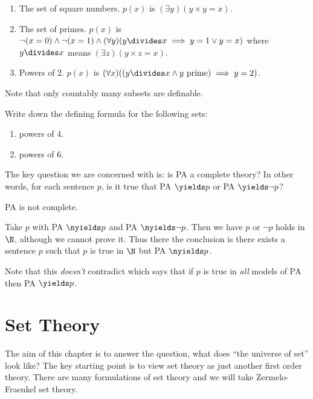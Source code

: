 \documentclass[a4paper]{article}
\begin{document}
\begin{eg}\leavevmode
  \begin{enumerate}
  \item The set of square numbers. \(p(x)\) is \((\exists y) (y \times y = x)\).
  \item The set of primes. \(p(x)\) is \(\neg (x = 0) \land \neg (x = 1) \land (\forall y) (y \divides x \implies y = 1 \lor y = x)\) where \(y \divides x\) means \((\exists z) (y \times z = x)\). 
  \item Powers of \(2\). \(p(x)\) is \((\forall x) ((y \divides x \land y \text{ prime}) \implies y = 2)\).
  \end{enumerate}
\end{eg}

Note that only countably many subsets are definable.

\begin{ex}
  Write down the defining formula for the following sets:
  \begin{enumerate}
  \item powers of \(4\).
  \item powers of \(6\).
  \end{enumerate}
\end{ex}

The key question we are concerned with is: is PA a complete theory? In other words, for each sentence \(p\), is it true that PA \(\yields p\) or PA \(\yields \neg p\)?

\begin{theorem}
  PA is not complete.
\end{theorem}

Take \(p\) with PA \(\nyields p\) and PA \(\nyields \neg p\). Then we have \(p\) or \(\neg p\) holds in \(\N\), although we cannot prove it. Thus there the conclusion is there exists a sentence \(p\) such that \(p\) is true in \(\N\) but PA \(\nyields p\).

Note that this \emph{doesn't} contradict  which says that if \(p\) is true in \emph{all} models of PA then PA \(\yields p\).

\section{Set Theory}

The aim of this chapter is to answer the question, what does ``the universe of set'' look like? The key starting point is to view set theory as just another first order theory. There are many formulations of set theory and we will take Zermelo-Fraenkel set theory.
\end{document}
